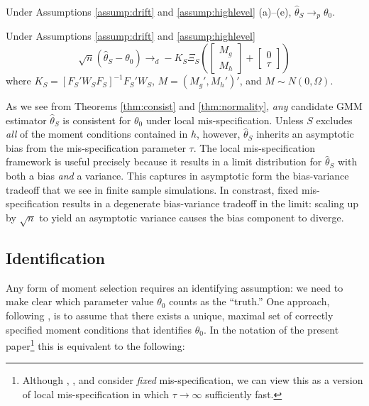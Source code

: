 \begin{thm}[Consistency]
\label{thm:consist}
Under Assumptions \ref{assump:drift} and \ref{assump:highlevel} (a)--(e), $\widehat{\theta}_S \rightarrow_{p} \theta_0$.
\end{thm}

\begin{thm}
\label{thm:normality}
Under Assumptions \ref{assump:drift} and \ref{assump:highlevel}
$$\sqrt{n}(\widehat{\theta}_S - \theta_0 ) \rightarrow_d -K_S \Xi_S  \left(\left[\begin{array}
	{c} M_g \\ M_h
\end{array} \right]  + \left[\begin{array}
	{c} 0 \\ \tau
\end{array} \right]\right)$$
where $K_S  = [F_S'W_SF_S]^{-1} F_S'W_S$, $M = (M_g', M_h')'$, and $M \sim N(0,\Omega)$.
\end{thm}

As we see from Theorems \ref{thm:consist} and \ref{thm:normality}, \emph{any} candidate GMM estimator $\widehat{\theta}_S$ is consistent for $\theta_0$ under local mis-specification. 
Unless $S$ excludes \emph{all} of the moment conditions contained in $h$, however, $\widehat{\theta}_S$ inherits an asymptotic bias from the mis-specification parameter $\tau$. 
The local mis-specification framework is useful precisely because it results in a limit distribution for $\widehat{\theta}_S$ with both a bias \emph{and} a variance. 
This captures in asymptotic form the bias-variance tradeoff that we see in finite sample simulations.
In constrast, fixed mis-specification results in a degenerate bias-variance tradeoff in the limit: scaling up by $\sqrt{n}$ to yield an asymptotic variance causes the bias component to diverge.

\subsection{Identification}
\label{sec:ident}
Any form of moment selection requires an identifying assumption: we need to make clear which parameter value $\theta_0$ counts as the ``truth.''
One approach, following \cite{Andrews1999}, is to assume that there exists a unique, maximal set of correctly specified moment conditions that identifies $\theta_0$. 
In the notation of the present paper\footnote{Although \cite{Andrews1999}, \cite{AndrewsLu}, and \cite{HongPrestonShum} consider \emph{fixed} mis-specification, we can view this as a version of local mis-specification in which $\tau \rightarrow \infty$ sufficiently fast.} this is equivalent to the following:

